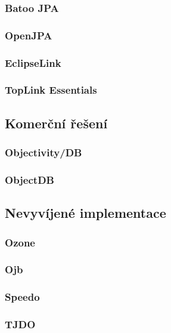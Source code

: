 \subsubsection{Batoo JPA}
\subsubsection{OpenJPA}
\subsubsection{EclipseLink}
\subsubsection{TopLink Essentials}
\subsection{Komerční řešení}
\subsubsection{Objectivity/DB}
\subsubsection{ObjectDB}
\subsection{Nevyvíjené implementace}
\subsubsection{Ozone}
\subsubsection{Ojb}
\subsubsection{Speedo}
\subsubsection{TJDO}


